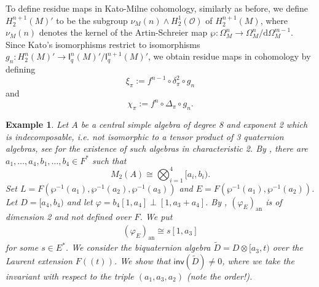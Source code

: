 \documentclass{amsart}
\newtheorem{example}[definition]{Example}
\numberwithin{equation}{section}
\newcommand{\an}{\mathrm{an}} %
\newcommand{\dbrac}[1]{(\!(#1)\!)}
\newcommand{\quat}[1]{[#1)}
\newcommand{\diff}{\mathrm{d}}
\newcommand{\I}{\mathsf{I}}
\newcommand{\inv}{\mathsf{inv}}
\begin{document}
To define residue maps in Kato-Milne cohomology, similarly as before, we define $H_2^{n+1}(M)'$ to be the subgroup $\nu_M(n) \wedge H_2^1(\mathcal O)$ of $H_2^{n+1}(M)$, where $\nu_M(n)$ denotes the kernel of the Artin-Schreier map $\wp: \Omega_M^n \to \Omega_M^n / \diff \Omega_M^{m-1}$.
Since Kato's isomorphisms restrict to isomorphisms $g_n: H_2^n(M)' \to \I^n_q(M)' / \I^{n+1}_q(M)'$, we obtain residue maps in cohomology by defining
\[\xi_\pi:= f^{n-1} \circ \delta^2_\pi \circ g_{n}\]
and
\[\chi_\pi := f^{n} \circ \Delta_\pi \circ g_{n}.\]

\begin{example} \label{ex_NontrivialInv}
    Let $A$ be a central simple algebra of degree 8 and exponent 2 which is indecomposable, i.e. not isomorphic to a tensor product of 3 quaternion algebras, see \cite[Section 3]{Rowen_DivisionAlgebraExp2Char2} for the existence of such algebras in characteristic 2.
    By \cite[Theorem 2]{Rowen_DivisionAlgebraExp2Char2}, there are $a_1, \ldots, a_4, b_1, \ldots, b_4 \in F^\ast$ such that
    \[M_2(A) \cong \bigotimes_{i = 1}^4\quat{a_i, b_i}.\]
    Set $L = F(\wp^{-1}(a_1), \wp^{-1}(a_2), \wp^{-1}(a_3))$ and $E = F(\wp^{-1}(a_1), \wp^{-1}(a_2))$.
    Let $D = \quat{a_4, b_4}$ and let $\varphi = b_4[1, a_4] \perp [1, a_3 + a_4]$.
    By \cite[Example 6.1]{LaghribiMukhija_ExcellenceInsepQuartic}, $(\varphi_E)_\an$ is of dimension 2 and not defined over $F$.
    We put
    \begin{align} \label{eq_anisotropicPartPhi}
        (\varphi_E)_\an \cong s[1, a_3]
    \end{align} for some $s \in E^\ast$.
    We consider the biquaternion algebra $\tilde D = D \otimes \quat{a_3, t}$ over the Laurent extension $F\dbrac t$.
    We show that $\inv(\tilde D) \neq 0$, where we take the invariant with respect to the triple $(a_1, a_3, a_2)$ (note the order!).
    

\end{example}
\end{document}
